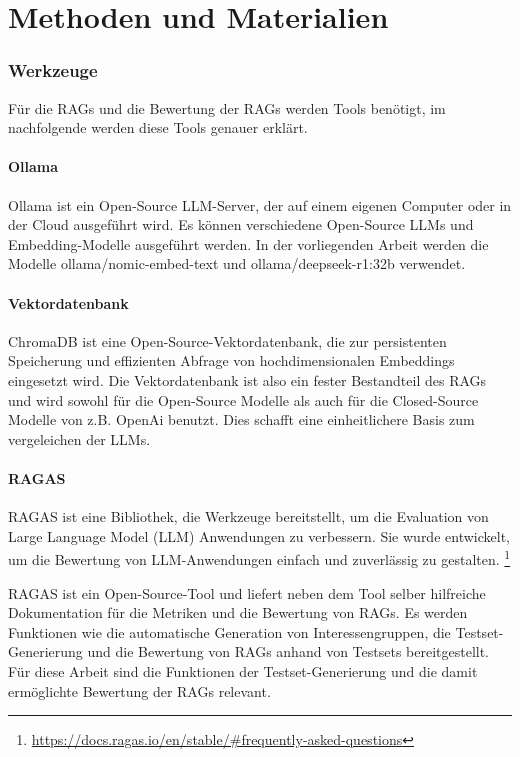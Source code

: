\chapter{Methoden und Materialien}

\subsection{Werkzeuge}

Für die RAGs und die Bewertung der RAGs werden Tools benötigt, im nachfolgende werden diese Tools genauer erklärt.

\subsubsection{Ollama}
Ollama ist ein Open-Source LLM-Server, der auf einem eigenen Computer oder in der Cloud ausgeführt wird.
Es können verschiedene Open-Source LLMs und Embedding-Modelle ausgeführt werden. In der vorliegenden Arbeit werden die Modelle ollama/nomic-embed-text und ollama/deepseek-r1:32b verwendet.

\subsubsection{Vektordatenbank}
ChromaDB ist eine Open-Source-Vektordatenbank, die zur persistenten Speicherung und effizienten Abfrage von hochdimensionalen Embeddings eingesetzt wird.
Die Vektordatenbank ist also ein fester Bestandteil des RAGs und wird sowohl für die Open-Source Modelle als auch für die Closed-Source Modelle von z.B. OpenAi benutzt. Dies schafft eine einheitlichere Basis zum vergeleichen der LLMs.

\subsubsection{RAGAS}
RAGAS ist eine Bibliothek, die Werkzeuge bereitstellt, um die Evaluation von Large Language Model (LLM) Anwendungen zu verbessern.
Sie wurde entwickelt, um die Bewertung von LLM-Anwendungen einfach und zuverlässig zu gestalten.
\footnote{\url{https://docs.ragas.io/en/stable/\#frequently-asked-questions}}

RAGAS ist ein Open-Source-Tool und liefert neben dem Tool selber hilfreiche Dokumentation für die Metriken und die Bewertung von RAGs.
Es werden Funktionen wie die automatische Generation von Interessengruppen, die Testset-Generierung und die Bewertung von RAGs anhand von Testsets bereitgestellt.
Für diese Arbeit sind die Funktionen der Testset-Generierung und die damit ermöglichte Bewertung der RAGs relevant.


